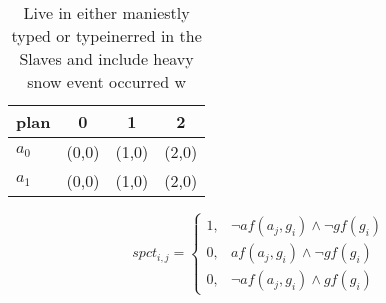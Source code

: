 \documentclass[a4paper]{article}
\begin{document}
\begin{table}
\begin{adjustbox}{width=1\columnwidth}
\begin{tabular}{|l|l|l|l|}
\hline
\textbf{plan} & \multicolumn{1}{c|}{\textbf{0}} & \multicolumn{1}{c|}{\textbf{1}} & \multicolumn{1}{c|}{\textbf{2}} \\ \hline
\textbf{$a_0$}  & (0,0) & (1,0) & (2,0) \\ \hline
\textbf{$a_1$}  & (0,0) & (1,0) & (2,0) \\ \hline
\end{tabular}
\end{adjustbox}
\caption{Live in either maniestly typed or typeinerred in the Slaves and include heavy snow event occurred w
}
\end{table}

\begin{equation}
spct_{i,j} =
\begin{cases}
1, & \text{$\neg af(a_j,g_i) \wedge \neg gf(g_i)$}\\
0, & \text{$af(a_j,g_i) \wedge \neg gf(g_i)$}\\
0, & \text{$\neg af(a_j,g_i) \wedge gf(g_i)$}
\end{cases}
\end{equation}
\end{document}
